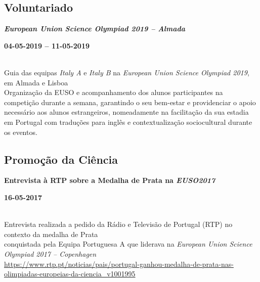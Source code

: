 \documentclass[8pt]{extarticle}
\newcommand{\parag}[1]{
\begin{minipage}{\textwidth} \hfill
\begin{minipage}{\dimexpr\textwidth-0.6cm}
	#1
\end{minipage}
\end{minipage}
}
\newcommand{\itemtime}[2]{
#1 \hfill \begin{minipage}[t]{0.185\textwidth}         #2  \end{minipage}
}
\newcommand{\job}[3]{\parag{
\itemtime{\textbf{#1}}{\textbf{#2}}\\
#3 \vspace*{9px}}}
\begin{document}
\subsection*{Voluntariado}
\job{\textit{European Union Science Olympiad 2019 – Almada}}{04-05-2019 – 11-05-2019}{
Guia das equipas \textit{Italy A} e \textit{Italy B} na \textit{European Union Science Olympiad 2019}, em Almada e Lisboa\\
Organização da EUSO e acompanhamento dos alunos participantes na competição durante a semana, garantindo o seu bem-estar e providenciar o apoio necessário aos alunos estrangeiros, nomeadamente na facilitação da sua estadia em Portugal com traduções para inglês e contextualização sociocultural durante os eventos.
}
\subsection*{Promoção da Ciência}
\job{Entrevista à RTP sobre a Medalha de Prata na \textit{EUSO2017}}{16-05-2017}{
Entrevista realizada a pedido da Rádio e Televisão de Portugal (RTP) no contexto da medalha de Prata\\
conquistada pela Equipa Portuguesa A que liderava na \textit{European Union Science Olympiad 2017 – Copenhagen}\\
\url{https://www.rtp.pt/noticias/pais/portugal-ganhou-medalha-de-prata-nas-olimpiadas-europeias-da-ciencia_v1001995}
}
\end{document}
